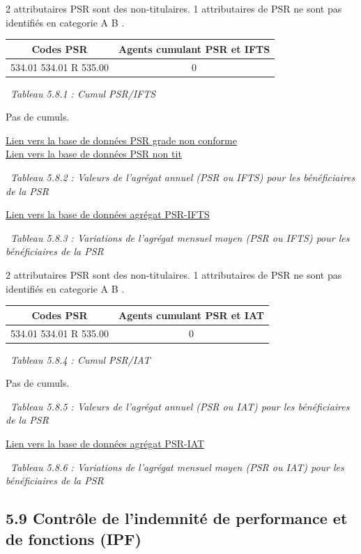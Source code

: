 2 attributaires PSR sont des non-titulaires. 1 attributaires de PSR ne
sont pas identifiés en categorie A B .

\begin{longtable}[]{@{}cc@{}}
\toprule
Codes PSR & Agents cumulant PSR et IFTS\tabularnewline
\midrule
\endhead
534.01 534.01 R 535.00 & 0\tabularnewline
\bottomrule
\end{longtable}

~\emph{Tableau 5.8.1 : Cumul PSR/IFTS}

Pas de cumuls.

\href{../Bases/Reglementation/PSR.non.catAB.csv}{Lien vers la base de
données PSR grade non conforme}\\
\href{../Bases/Reglementation/PSR.non.tit.csv}{Lien vers la base de données
PSR non tit}

~\emph{Tableau 5.8.2 : Valeurs de l'agrégat annuel (PSR ou IFTS) pour
les bénéficiaires de la PSR}

\href{../Bases/Remunerations/beneficiaires.PSR.IFTS.csv}{Lien vers la base
de données agrégat PSR-IFTS}

~\emph{Tableau 5.8.3 : Variations de l'agrégat mensuel moyen (PSR ou
IFTS) pour les bénéficiaires de la PSR}

2 attributaires PSR sont des non-titulaires. 1 attributaires de PSR ne
sont pas identifiés en categorie A B .

\begin{longtable}[]{@{}cc@{}}
\toprule
Codes PSR & Agents cumulant PSR et IAT\tabularnewline
\midrule
\endhead
534.01 534.01 R 535.00 & 0\tabularnewline
\bottomrule
\end{longtable}

~\emph{Tableau 5.8.4 : Cumul PSR/IAT}

Pas de cumuls.

~\emph{Tableau 5.8.5 : Valeurs de l'agrégat annuel (PSR ou IAT) pour les
bénéficiaires de la PSR}

\href{../Bases/Remunerations/beneficiaires.PSR.IAT.csv}{Lien vers la base
de données agrégat PSR-IAT}

~\emph{Tableau 5.8.6 : Variations de l'agrégat mensuel moyen (PSR ou
IAT) pour les bénéficiaires de la PSR}

\hypertarget{controle-de-lindemnite-de-performance-et-de-fonctions-ipf}{%
\subsection{5.9 Contrôle de l'indemnité de performance et de fonctions
(IPF)}\label{controle-de-lindemnite-de-performance-et-de-fonctions-ipf}}

